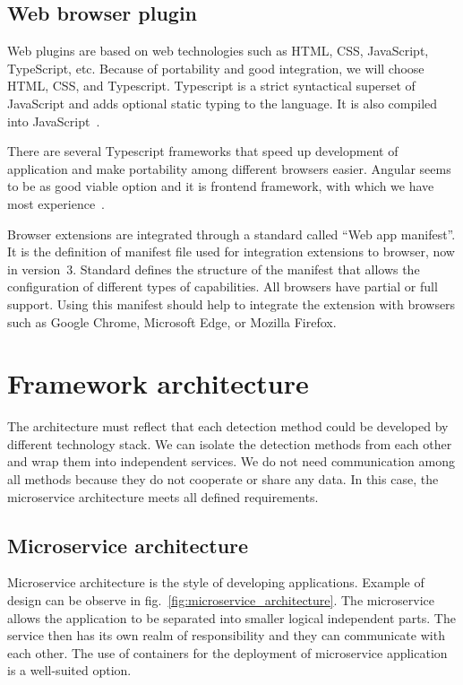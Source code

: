 \section{Web browser plugin}

Web plugins are based on web technologies such as HTML, CSS, JavaScript, TypeScript, etc. Because of portability and good integration, we will choose HTML, CSS, and Typescript. Typescript is a strict syntactical superset of JavaScript and adds optional static typing to the language. It is also compiled into JavaScript~\cite{Typescript}.

There are several Typescript frameworks that speed up development of application and make portability among different browsers easier. Angular seems to be as good viable option and it is frontend framework, with which we have most experience~\cite{Angular}.

Browser extensions are integrated through a standard called “Web app manifest”. It is the definition of manifest file used for integration extensions to browser, now in version~3. Standard defines the structure of the manifest that allows the configuration of different types of capabilities.  All browsers have partial or full support. Using this manifest should help to integrate the extension with browsers such as Google Chrome, Microsoft Edge, or Mozilla Firefox.~\cite{WebAppManifest}

\chapter{Framework architecture}

The architecture must reflect that each detection method could be developed by different technology stack. We can isolate the detection methods from each other and wrap them into independent services. We do not need communication among all methods because they do not cooperate or share any data. In this case, the microservice architecture meets all defined requirements.

\section{Microservice architecture}

Microservice architecture is the style of developing applications. Example of design can be observe in fig.~\ref{fig:microservice_architecture}. The microservice allows the application to be separated into smaller logical independent parts. The service then has its own realm of responsibility and they can communicate with each other. The use of containers for the deployment of microservice application is a well-suited option.~\cite{WhatIsMicroservicesArchitecture}

